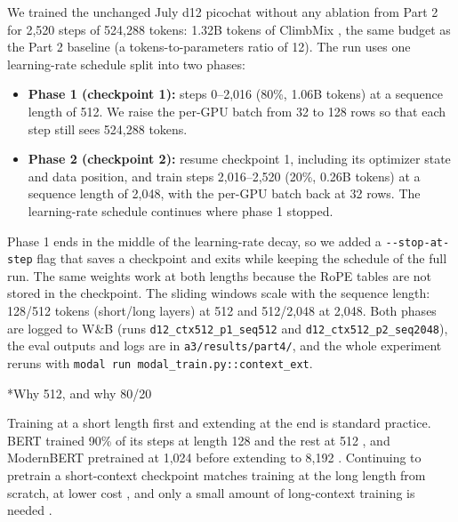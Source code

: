 \documentclass[11pt]{article}
\makeatletter
\renewcommand\subsection{\@startsection{subsection}{2}{\z@}{0.6em}{0.2em}{\normalsize\bfseries}}
\newcommand{\code}[1]{\texttt{#1}}
\makeatother
\begin{document}
We trained the unchanged July d12 picochat without any ablation from Part 2 for 2,520 steps of 524,288 tokens: 1.32B tokens of ClimbMix \cite{climbmix}, the same budget as the Part 2 baseline (a tokens-to-parameters ratio of 12). The run uses one learning-rate schedule split into two phases:
\begin{itemize}
  \item \textbf{Phase 1 (checkpoint 1):} steps 0--2,016 (80\%, 1.06B tokens) at a sequence length of 512. We raise the per-GPU batch from 32 to 128 rows so that each step still sees 524,288 tokens.
  \item \textbf{Phase 2 (checkpoint 2):} resume checkpoint 1, including its optimizer state and data position, and train steps 2,016--2,520 (20\%, 0.26B tokens) at a sequence length of 2,048, with the per-GPU batch back at 32 rows. The learning-rate schedule continues where phase 1 stopped.
\end{itemize}
Phase 1 ends in the middle of the learning-rate decay, so we added a \code{-{}-stop-at-step} flag that saves a checkpoint and exits while keeping the schedule of the full run. The same weights work at both lengths because the RoPE tables are not stored in the checkpoint. The sliding windows scale with the sequence length: 128/512 tokens (short/long layers) at 512 and 512/2,048 at 2,048. Both phases are logged to W\&B (runs \code{d12\_ctx512\_p1\_seq512} and \code{d12\_ctx512\_p2\_seq2048}), the eval outputs and logs are in \code{a3/results/part4/}, and the whole experiment reruns with \code{modal run modal\_train.py::context\_ext}.

\subsection*{Why 512, and why 80/20}

Training at a short length first and extending at the end is standard practice. BERT trained 90\% of its steps at length 128 and the rest at 512 \cite{bert}, and ModernBERT pretrained at 1,024 before extending to 8,192 \cite{modernbert}. Continuing to pretrain a short-context checkpoint matches training at the long length from scratch, at lower cost \cite{xiong}, and only a small amount of long-context training is needed \cite{fu}.
\end{document}
